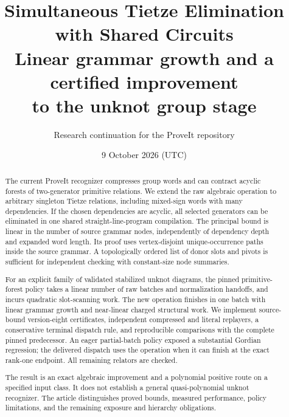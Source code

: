 \documentclass[11pt,letterpaper]{article}
\title{\textbf{Simultaneous Tietze Elimination\protect\\with Shared Circuits}\\[5pt]
  \large Linear grammar growth and a certified improvement\protect\\
  to the unknot group stage}
\author{Research continuation for the ProveIt repository}
\date{9 October 2026 (UTC)}
\theoremstyle{definition}
\begin{document}
\maketitle
\begin{abstract}
The current ProveIt recognizer compresses group words and can contract
acyclic forests of two-generator primitive relations. We extend the raw
algebraic operation to arbitrary singleton Tietze relations, including
mixed-sign words with many dependencies. If the chosen dependencies are
acyclic, all selected generators can be eliminated in one shared
straight-line-program compilation. The principal bound is linear in the
number of source grammar nodes, independently of dependency depth and
expanded word length. Its proof uses vertex-disjoint unique-occurrence paths
inside the source grammar. A topologically ordered list of donor slots and
pivots is sufficient for independent checking with constant-size node
summaries.

For an explicit family of validated stabilized unknot diagrams, the pinned
primitive-forest policy takes a linear number of raw batches and normalization
handoffs, and incurs quadratic slot-scanning work. The new operation finishes
in one batch with linear grammar growth and near-linear charged structural
work. We implement source-bound version-eight certificates, independent
compressed and literal replayers, a conservative terminal dispatch rule,
and reproducible comparisons with the complete pinned predecessor.
An eager partial-batch policy exposed a substantial Gordian regression;
the delivered dispatch uses the operation when it can finish at the exact
rank-one endpoint. All remaining relators are checked.

The result is an exact algebraic improvement and a polynomial positive route
on a specified input class. It does not establish a general quasi-polynomial
unknot recognizer. The article distinguishes proved bounds, measured
performance, policy limitations, and the remaining exposure and hierarchy
obligations.
\end{abstract}
\newpage
\begingroup
\small
\tableofcontents
\endgroup
\newpage






\appendix

\begingroup
\raggedright


\endgroup
\end{document}
